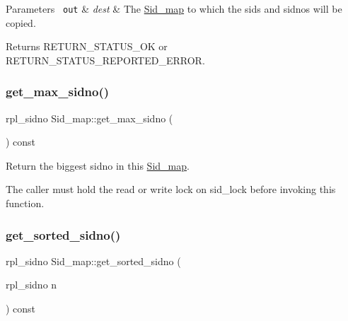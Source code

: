 \begin{DoxyParams}[1]{Parameters}
\mbox{\texttt{ out}}  & {\em dest} & The \mbox{\hyperlink{classSid__map}{Sid\+\_\+map}} to which the sids and sidnos will be copied. \\
\hline
\end{DoxyParams}
\begin{DoxyReturn}{Returns}
R\+E\+T\+U\+R\+N\+\_\+\+S\+T\+A\+T\+U\+S\+\_\+\+OK or R\+E\+T\+U\+R\+N\+\_\+\+S\+T\+A\+T\+U\+S\+\_\+\+R\+E\+P\+O\+R\+T\+E\+D\+\_\+\+E\+R\+R\+OR. 
\end{DoxyReturn}
\mbox{\label{classSid__map_a4e1dbe6bf6fbaf1d6c3199cd407a620c}} 
\subsubsection{\texorpdfstring{get\+\_\+max\+\_\+sidno()}{get\_max\_sidno()}}
{\footnotesize\ttfamily rpl\+\_\+sidno Sid\+\_\+map\+::get\+\_\+max\+\_\+sidno (\begin{DoxyParamCaption}{ }\end{DoxyParamCaption}) const\hspace{0.3cm}{\ttfamily [inline]}}

Return the biggest sidno in this \mbox{\hyperlink{classSid__map}{Sid\+\_\+map}}.

The caller must hold the read or write lock on sid\+\_\+lock before invoking this function. \mbox{\label{classSid__map_a136025a5e9fb2ea21eb4da9d44060fce}} 
\subsubsection{\texorpdfstring{get\+\_\+sorted\+\_\+sidno()}{get\_sorted\_sidno()}}
{\footnotesize\ttfamily rpl\+\_\+sidno Sid\+\_\+map\+::get\+\_\+sorted\+\_\+sidno (\begin{DoxyParamCaption}\item[{rpl\+\_\+sidno}]{n }\end{DoxyParamCaption}) const\hspace{0.3cm}{\ttfamily [inline]}}

